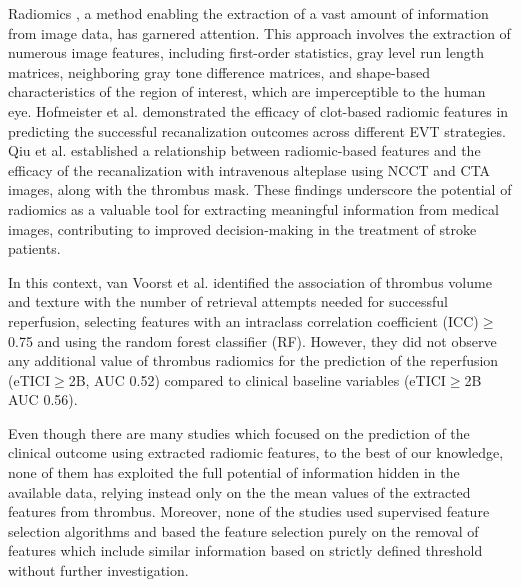 \documentclass[preprint,12pt]{elsarticle}
\begin{document}
Radiomics \cite{Qiu2018}, a method enabling the extraction of a vast amount of information from image data, has garnered attention. This approach involves the extraction of numerous image features, including first-order statistics, gray level run length matrices, neighboring gray tone difference matrices, and shape-based characteristics of the region of interest, which are imperceptible to the human eye. 
Hofmeister et al. \cite{Hofmeister2020} demonstrated the efficacy of clot-based radiomic features in predicting the successful recanalization outcomes across different EVT strategies. Qiu et al. \cite{Qiu2018} established a relationship between radiomic-based features and the efficacy of the recanalization with intravenous alteplase using NCCT and CTA images, along with the thrombus mask. These findings underscore the potential of radiomics as a valuable tool for extracting meaningful information from medical images, contributing to improved decision-making in the treatment of stroke patients. 


In this context, van Voorst et al. \cite{vanVoorst2022} identified the association of thrombus volume and texture with the number of retrieval attempts needed for successful reperfusion, selecting features with an intraclass correlation coefficient (ICC)$\geq$0.75 and using the random forest classifier (RF). However, they did not observe any additional value of thrombus radiomics for the prediction of the reperfusion (eTICI$\geq$2B, AUC 0.52) compared to clinical baseline variables (eTICI$\geq$2B AUC 0.56). 


Even though there are many studies which focused on the prediction of the clinical outcome using extracted radiomic features, to the best of our knowledge, none of them has exploited the full potential of information hidden in the available data, relying instead only on the the mean values of the extracted features from thrombus. Moreover, none of the studies used supervised feature selection algorithms and based the feature selection purely on the removal of features which include similar information based on strictly defined threshold without further investigation.   
\end{document}
